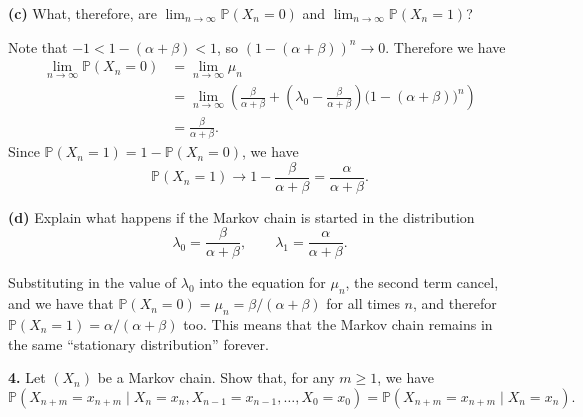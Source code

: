 \documentclass[
  a4paper,
]{article}
\theoremstyle{definition}
\theoremstyle{definition}
\theoremstyle{definition}
\theoremstyle{remark}
\begin{document}
\textbf{(c)} What, therefore, are \(\lim_{n\to\infty} \mathbb P(X_n = 0)\) and \(\lim_{n\to\infty} \mathbb P(X_n = 1)\)?

\begin{myanswers}

Note that \(-1 < 1 - (\alpha + \beta) < 1\), so \((1-(\alpha+\beta))^n \to 0\). Therefore we have
\begin{align*}
\lim_{n\to\infty} \mathbb P(X_n = 0) &= \lim_{n\to\infty} \mu_n \\
&= \lim_{n\to\infty} \left( \frac{\beta}{\alpha+\beta} + \left(\lambda_0 - \frac{\beta}{\alpha+\beta}\right)\big(1-(\alpha+\beta)\big)^n \right) \\
&= \frac{\beta}{\alpha+\beta} .
\end{align*}
Since \(\mathbb P(X_n = 1) = 1- \mathbb P(X_n = 0)\), we have
\[ \mathbb P(X_n = 1) \to 1 - \frac{\beta}{\alpha+\beta} = \frac{\alpha}{\alpha+\beta} . \]

\end{myanswers}

\textbf{(d)} Explain what happens if the Markov chain is started in the distribution
\[ \lambda_0 = \frac{\beta}{\alpha+\beta} , \qquad \lambda_1 = \frac{\alpha}{\alpha+\beta}  . \]

\begin{myanswers}

Substituting in the value of \(\lambda_0\) into the equation for \(\mu_n\), the second term cancel, and we have that \(\mathbb P(X_n = 0) = \mu_n = \beta/(\alpha+\beta)\) for all times \(n\), and therefor \(\mathbb P(X_n = 1) = \alpha/(\alpha+\beta)\) too. This means that the Markov chain remains in the same ``stationary distribution'' forever.

\end{myanswers}

\textbf{4.} Let \((X_n)\) be a Markov chain. Show that, for any \(m \geq 1\), we have
\[ \mathbb P(X_{n+m} = x_{n+m} \mid X_n = x_n, X_{n-1} = x_{n-1}, \dots, X_0 = x_0)  =  \mathbb P(X_{n+m} = x_{n+m} \mid X_n = x_n) . \]
\end{document}
